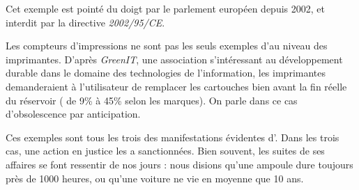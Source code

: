 Cet exemple est pointé du doigt par le parlement européen depuis 2002, et interdit par la directive \textit{2002/95/CE}. 
\smallbreak

Les compteurs d'impressions ne sont pas les seuls exemples d'\op au niveau des imprimantes. D'après \textit{GreenIT}\cite{greenit_cartouche_encre}, une association s'intéressant au développement durable  dans le domaine des technologies de l'information, les imprimantes demanderaient à l'utilisateur de remplacer les cartouches bien avant la fin réelle du réservoir ( de 9\% à 45\% selon les marques). On parle dans ce cas d'obsolescence par anticipation.


\medbreak

Ces exemples sont tous les trois des manifestations évidentes d'\op. Dans les trois cas, une action en justice les a sanctionnées. Bien souvent, les suites de ses affaires se font ressentir de nos jours : nous disions qu'une ampoule dure toujours près de 1000 heures, ou qu'une voiture ne vie en moyenne que 10 ans. 
